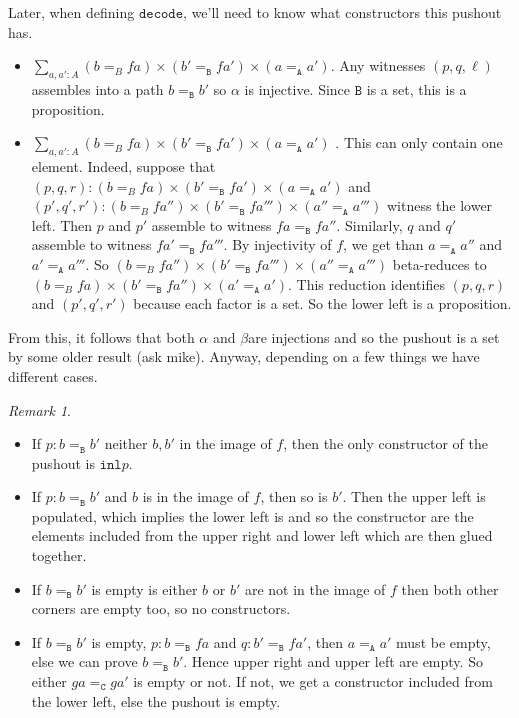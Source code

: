 \message{ !name(notes.tex)}\documentclass[12pt]{amsart}
\newcommand{\type}[1]{\mathtt{#1}}
\newcommand{\A}{\type{A}}
\newcommand{\B}{\type{B}}
\newcommand{\C}{\type{C}}
\newcommand{\inl}{\type{inl}}
\newcommand{\decode}{\type{decode}}
\theoremstyle{remark}
\newtheorem{rmk}{Remark}
\theoremstyle{definition}
\begin{document}
Later, when defining $ \decode $, we'll need to know what constructors this pushout has.  
\begin{itemize}
	\item $  \sum_{ a , a' : A } ( b =_B f  a ) \times ( b' =_{\B} f  a' ) \times ( a =_{\A} a' ) $.  Any witnesses $ (p,q,\ell) $ assembles into a path $ b =_{\B} b' $ so $ \alpha $ is injective.  Since $ \B $ is a set, this is a proposition.
	\item $  \sum_{ a , a' : A } ( b =_B f  a ) \times ( b' =_{\B} f  a' ) \times ( a =_{\A} a' ) $ .  This can only contain one element.  Indeed, suppose that $ (p,q,r) : ( b =_B f  a ) \times ( b' =_{\B} f  a' ) \times ( a =_{\A} a' ) $ and $ (p',q',r') : ( b =_B f  a'' ) \times ( b' =_{\B} f  a''' ) \times ( a'' =_{\A} a''' ) $ witness the lower left.  Then $ p $ and $ p' $ assemble to witness $ fa =_{\B} fa'' $. Similarly, $ q $ and $ q' $ assemble to witness $ fa' =_{\B} fa''' $. By injectivity of $ f $, we get than $ a =_{\A} a'' $ and $ a' =_{\A} a''' $.  So $ ( b =_B f  a'' ) \times ( b' =_{\B} f  a''' ) \times ( a'' =_{\A} a''' ) $ beta-reduces to $ ( b =_B f  a ) \times ( b' =_{\B} f  a'' ) \times ( a' =_{\A} a' ) $. This reduction identifies $ (p,q,r) $ and $ (p',q',r') $ because each factor is a set.  So the lower left is a proposition.
\end{itemize}

From this, it follows that both $ \alpha $ and $ \beta $are injections and so the pushout is a set by some older result (ask mike).  Anyway, depending on a few things we have different cases.
\begin{rmk} \label{rmk_code-bb-cases}
\begin{itemize}
	\item If $ p : b =_{\B} b' $ neither $ b,b' $ in the image of $ f $, then the only constructor of the pushout is $ \inl p $.
	\item If $ p : b =_{\B} b' $ and $ b $ is in the image of $ f $, then so is $ b' $.  Then the upper left is populated, which implies the lower left is and so the constructor are the elements included from the upper right and lower left which are then glued together.
	\item If $ b =_{\B} b' $ is empty is either $ b $ or $ b' $ are not in the image of $ f $ then both other corners are empty too, so no constructors.
	\item If $ b =_{\B} b' $ is empty, $ p: b =_{\B} fa $ and $ q : b' =_{\B} fa' $, then $ a =_{\A} a' $ must be empty, else we can prove $ b=_{\B}b' $. Hence upper right and upper left are empty.  So either $ ga =_{\C} ga' $ is empty or not.  If not, we get a constructor included from the lower left, else the pushout is empty.  
\end{itemize}
\end{rmk}
\end{document}
